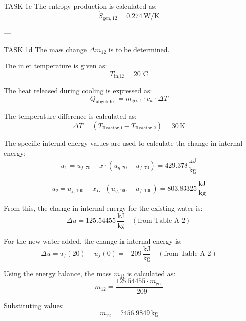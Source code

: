 TASK 1c  
The entropy production is calculated as:  
\[
\dot{S}_{\text{gen},12} = 0.274 \, \text{W/K}
\]

---

TASK 1d  
The mass change \( \Delta m_{12} \) is to be determined.  

The inlet temperature is given as:  
\[
T_{\text{in,12}} = 20^\circ\text{C}
\]

The heat released during cooling is expressed as:  
\[
Q_{\text{abgeführt}} = m_{\text{ges,1}} \cdot c_w \cdot \Delta T
\]

The temperature difference is calculated as:  
\[
\Delta T = (T_{\text{Reactor,1}} - T_{\text{Reactor,2}}) = 30 \, \text{K}
\]

The specific internal energy values are used to calculate the change in internal energy:  
\[
u_1 = u_{f,70} + x \cdot (u_{g,70} - u_{f,70}) = 429.378 \, \frac{\text{kJ}}{\text{kg}}
\]

\[
u_2 = u_{f,100} + x_D \cdot (u_{g,100} - u_{f,100}) = 803.83325 \, \frac{\text{kJ}}{\text{kg}}
\]

From this, the change in internal energy for the existing water is:  
\[
\Delta u = 125.54455 \, \frac{\text{kJ}}{\text{kg}} \quad (\text{from Table A-2})
\]

For the new water added, the change in internal energy is:  
\[
\Delta u = u_f(20) - u_f(0) = -209 \, \frac{\text{kJ}}{\text{kg}} \quad (\text{from Table A-2})
\]

Using the energy balance, the mass \( m_{12} \) is calculated as:  
\[
m_{12} = \frac{125.54455 \cdot m_{\text{ges}}}{-209}
\]

Substituting values:  
\[
m_{12} = 3456.9849 \, \text{kg}
\]